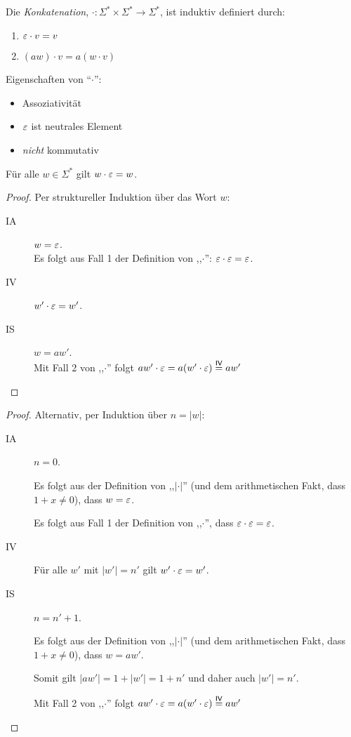 \begin{Def}
  Die \emph{Konkatenation}, $\mathord{\cdot} : \Sigma^* \times \Sigma^* \to \Sigma^*$, ist induktiv definiert durch:
  \begin{enumerate}
  \item $\varepsilon\cdot v = v$
  \item $(aw)\cdot v = a(w\cdot v)$
  \end{enumerate}
\end{Def}
Eigenschaften von "`$\cdot$"':
\begin{itemize}
\item Assoziativität
\item $\varepsilon$ ist neutrales Element
\item \emph{nicht} kommutativ
\end{itemize}
\begin{lemma}
  Für alle $w \in \Sigma^*$ gilt $w \cdot \varepsilon = w$.
\end{lemma}
\begin{proof}
  Per struktureller Induktion über das Wort $w$:
  \begin{description}
  \item[IA] $w = \varepsilon$. \\
      Es folgt aus Fall 1 der Definition von ,,$\cdot$'': $\varepsilon \cdot \varepsilon = \varepsilon$.
  \item[IV] $w' \cdot \varepsilon = w'$.
  \item[IS] $w = aw'$.
    \\
    Mit Fall 2 von ,,$\cdot$'' folgt $aw' \cdot \varepsilon = a (w' \cdot \varepsilon) \stackrel{\mathsf{IV}}{=} aw'$
  \end{description}
\end{proof}
\begin{proof}
  Alternativ, per Induktion über $n = |w|$:
  \begin{description}
  \item[IA] $n = 0$.

    Es folgt aus der Definition von ,,$|\cdot|$'' (und dem arithmetischen Fakt, dass $1 + x \not = 0$), dass $w = \varepsilon$.

    Es folgt aus Fall 1 der Definition von ,,$\cdot$'', dass $\varepsilon \cdot \varepsilon = \varepsilon$.
  \item[IV] Für alle $w'$ mit $|w'| = n'$ gilt $w' \cdot \varepsilon = w'$.
  \item[IS] $n = n' + 1$.

    Es folgt aus der Definition von ,,$|\cdot|$'' (und dem arithmetischen Fakt, dass $1 + x \not = 0$), dass $w = aw'$.

    Somit gilt $|aw'| = 1 + |w'| = 1 + n'$ und daher auch $|w'| = n'$.

    Mit Fall 2 von ,,$\cdot$'' folgt $aw' \cdot \varepsilon = a (w' \cdot \varepsilon) \stackrel{\mathsf{IV}}{=} aw'$
  \end{description}
\end{proof}
